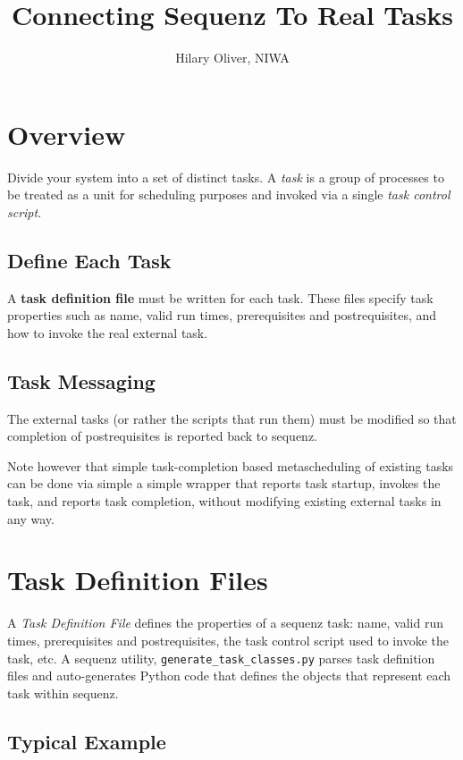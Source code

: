 \documentclass[11pt,a4paper]{article}
\title{Connecting Sequenz To Real Tasks}
\author{Hilary Oliver, NIWA}
\begin{document}
\maketitle
\tableofcontents

\section{Overview}

Divide your system into a set of distinct tasks. A {\em task} is a group
of processes to be treated as a unit for scheduling purposes and
invoked via a single {\em task control script}. 

\subsection{Define Each Task}

A \textbf{task definition file} must be written for each task. These
files specify task properties such as name, valid run times,
prerequisites and postrequisites, and how to invoke the real external
task.
    
\subsection{Task Messaging}

The external tasks (or rather the scripts that run them) must be 
modified so that completion of postrequisites is reported back to
sequenz. 

Note however that simple task-completion based metascheduling of
existing tasks can be done via simple a simple wrapper that reports task
startup, invokes the task, and reports task completion, without
modifying existing external tasks in any way.


\section{Task Definition Files}

A {\em Task Definition File} defines the properties of a sequenz task:
name, valid run times, prerequisites and postrequisites, the task
control script used to invoke the task, etc.  A sequenz utility, 
\verb=generate_task_classes.py= parses task definition files and 
auto-generates Python code that defines the objects that represent
each task within sequenz.

\subsection{Typical Example}
\end{document}

